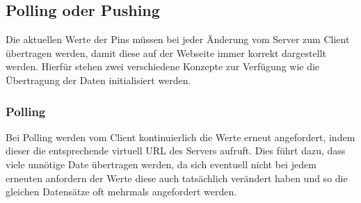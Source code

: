 
\subsection{Polling oder Pushing}
Die aktuellen Werte der Pins müssen bei jeder Änderung vom Server zum Client übertragen 
werden, damit diese auf der Webseite immer korrekt dargestellt werden. Hierfür stehen zwei 
verschiedene Konzepte zur Verfügung wie die Übertragung der Daten initialisiert werden.

\subsubsection{Polling}
Bei Polling werden vom Client kontinuierlich die Werte erneut angefordert, indem dieser 
die entsprechende virtuell URL des Servers aufruft. Dies führt dazu, dass viele unnötige 
Date übertragen werden, da sich eventuell nicht bei jedem erneuten anfordern der Werte 
diese auch tatsächlich verändert haben und so die gleichen Datensätze oft mehrmals 
angefordert werden.

